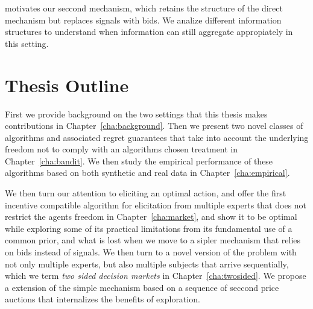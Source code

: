 motivates our seccond mechanism, which retains the structure of the direct mechanism but replaces signals with bids. We analize different information structures to understand when information can still aggregate appropiately in this setting.


\section{Thesis Outline}
\label{sec:outline}

First we provide background on the two settings that this thesis makes contributions in  Chapter~\ref{cha:background}. Then we present two novel classes of algorithms and associated regret guarantees that take into account the underlying freedom not to comply with an algorithms chosen treatment in Chapter~\ref{cha:bandit}. We then study the empirical performance  of these algorithms based on both synthetic and real data in Chapter~\ref{cha:empirical}. 

We then turn our attention to eliciting an optimal action, and offer the first incentive compatible algorithm for elicitation from multiple experts that does not restrict the agents freedom in Chapter~\ref{cha:market}, and show it to be optimal while exploring some of its practical limitations from its fundamental use of a common prior, and what is lost when we move to a sipler mechanism that relies on bids instead of signals. We then turn to a novel version of the problem with not only multiple experts, but also multiple subjects that arrive sequentially, which we term \emph{two sided decision markets} in Chapter~\ref{cha:twosided}. We propose a extension of the simple mechanism based on a sequence of seccond price auctions that internalizes the benefits of exploration.

